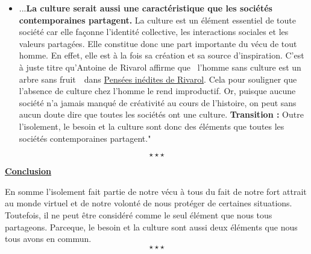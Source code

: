 \begin{enumerate}[label*=$\longrightarrow$]
\begin{itemize}
		\item ...\textbf{La culture serait aussi une caractéristique que les sociétés contemporaines partagent.} La culture est un élément essentiel de toute société car elle façonne l'identité collective, les interactions sociales et les valeurs partagées. Elle constitue donc une part importante du vécu de tout homme. En effet, elle est à la fois sa création et sa source d'inspiration. C'est à juste titre qu'Antoine de Rivarol affirme que \guillemetleft\ l'homme sans culture est un arbre sans fruit\ \guillemetright\ dans \underline{Pensées inédites de Rivarol}. Cela pour souligner que l'absence de culture chez l'homme le rend improductif. Or, puisque aucune société n'a jamais manqué de créativité au cours de l'histoire, on peut sans aucun doute dire que toutes les sociétés ont une culture. \newline \textbf{Transition :} Outre l'isolement, le besoin et la culture sont donc des éléments que toutes les sociétés contemporaines partagent." 
	\end{itemize}
\end{enumerate}
$$\star \star \star$$
\begin{center}
	\textbf{\underline{Conclusion}} 
\end{center}

En somme l'isolement fait partie de notre vécu à tous du fait de notre fort attrait au monde virtuel et de notre volonté de nous protéger de certaines situations. Toutefois, il ne peut être considéré comme le seul élément que nous tous partageons. Parceque, le besoin et la culture sont aussi deux éléments que nous tous avons en commun.$$\star \star \star$$